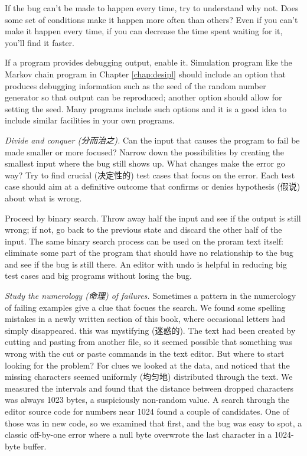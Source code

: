 If the bug can't be made to happen every time, try to understand why not.
Does some set of conditions make it happen more often than others? Even if
you can't make it happen every time, if you can decrease the time spent
waiting for it, you'll find it faster. 

If a program provides debugging output, enable it. Simulation program like
the Markov chain program in Chapter \ref{chap:desipl} should include an
option that produces debugging information such as the seed of the random
number generator so that output can be reproduced; another option should
allow for setting the seed. Many programs include such options and it is a
good idea to include similar facilities in your own programs.

\emph{Divide and conquer (分而治之).} Can the input that causes the program
to fail be made smaller or more focused? Narrow down the possibilities by
creating the smallest input where the bug still shows up. What changes make
the error go way? Try to find crucial (决定性的) test cases that focus on
the error. Each test case should aim at a definitive outcome that confirms
or denies hypothesis (假说) about what is wrong.

Proceed by binary search. Throw away half the input and see if the output
is still wrong; if not, go back to the previous state and discard the other
half of the input. The same binary search process can be used on the proram
text itself: eliminate some part of the program that should have no
relationship to the bug and see if the bug is still there. An editor with
undo is helpful in reducing big test cases and big programs without losing
the bug.

\emph{Study the numerology (命理) of failures.} Sometimes a pattern in the
numerology of failing examples give a clue that focues the search. We found
some spelling mistakes in a newly written section of this book, where
occasional letters had simply disappeared. this was mystifying (迷惑的).
The text had been created by cutting and pasting from another file, so it
seemed possible that something was wrong with the cut or paste commands in
the text editor. But where to start looking for the problem? For clues we
looked at the data, and noticed that the missing characters seemed
uniformly (均匀地) distributed through the text. We measured the intervals
and found that the distance between dropped characters was always 1023
bytes, a suspiciously non-random value. A search through the editor source
code for numbers near 1024 found a couple of candidates. One of those was
in new code, so we examined that first, and the bug was easy to spot, a
classic off-by-one error where a null byte overwrote the last character in
a 1024-byte buffer.

